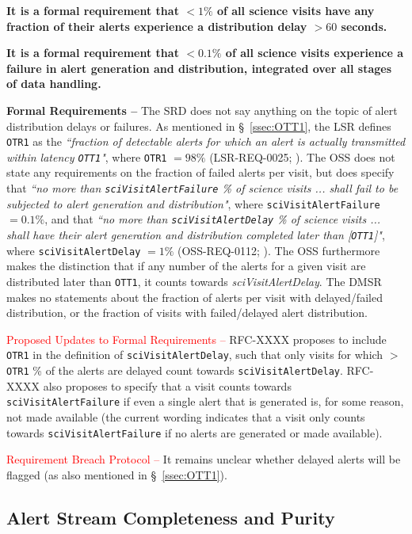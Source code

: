 \documentclass[DM,authoryear,toc]{lsstdoc}
\begin{document}
{\bf It is a formal requirement that $<1\%$ of all science visits have any fraction of their alerts experience a distribution delay $>60$ seconds.} 

{\bf It is a formal requirement that $<0.1\%$ of all science visits experience a failure in alert generation and distribution, integrated over all stages of data handling.}

{\bf Formal Requirements --} The SRD does not say anything on the topic of alert distribution delays or failures. As mentioned in \S~\ref{ssec:OTT1}, the LSR defines {\tt OTR1} as the {\it ``fraction of detectable alerts for which an alert is actually transmitted within latency {\tt OTT1}"}, where {\tt OTR1} $=98\%$ (LSR-REQ-0025; ). The OSS does not state any requirements on the fraction of failed alerts per visit, but does specify that {\it ``no more than {\tt sciVisitAlertFailure} \% of science visits ... shall fail to be subjected to alert generation and distribution"}, where {\tt sciVisitAlertFailure} $=0.1\%$, and that {\it ``no more than {\tt sciVisitAlertDelay} \% of science visits ... shall have their alert generation and distribution completed later than [{\tt OTT1}]"}, where {\tt sciVisitAlertDelay} $=1\%$ (OSS-REQ-0112; ). The OSS furthermore makes the distinction that if any number of the alerts for a given visit are distributed later than {\tt OTT1}, it counts towards {\it sciVisitAlertDelay}. The DMSR makes no statements about the fraction of alerts per visit with delayed/failed distribution, or the fraction of visits with failed/delayed alert distribution.

\textcolor{red}{Proposed Updates to Formal Requirements --} RFC-XXXX proposes to include {\tt OTR1} in the definition of {\tt sciVisitAlertDelay}, such that only visits for which $>${\tt OTR1} \% of the alerts are delayed count towards {\tt sciVisitAlertDelay}. RFC-XXXX also proposes to specify that a visit counts towards {\tt sciVisitAlertFailure} if even a single alert that is generated is, for some reason, not made available (the current wording indicates that a visit only counts towards {\tt sciVisitAlertFailure} if no alerts are generated or made available).

\textcolor{red}{Requirement Breach Protocol --} It remains unclear whether delayed alerts will be flagged (as also mentioned in \S~\ref{ssec:OTT1}). 


\subsection{Alert Stream Completeness and Purity}\label{ssec:comp_pure}
\end{document}

